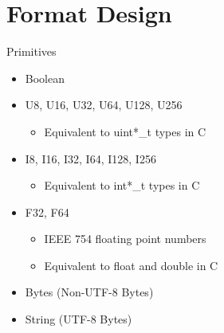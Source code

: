 \documentclass{beamer}
\begin{document}
\section{Format Design}

\begin{frame}{Primitives}
	\begin{itemize}
		\item Boolean
		\item U8, U16, U32, U64, U128, U256
		      \begin{itemize}
			      \item Equivalent to uint*\_t types in C
		      \end{itemize}
		\item I8, I16, I32, I64, I128, I256
		      \begin{itemize}
			      \item Equivalent to int*\_t types in C
		      \end{itemize}
		\item F32, F64
		      \begin{itemize}
			      \item IEEE 754 floating point numbers
			      \item Equivalent to float and double in C
		      \end{itemize}
		\item Bytes  (Non-UTF-8 Bytes)
		\item String (UTF-8 Bytes)
	\end{itemize}
\end{frame}
\end{document}
